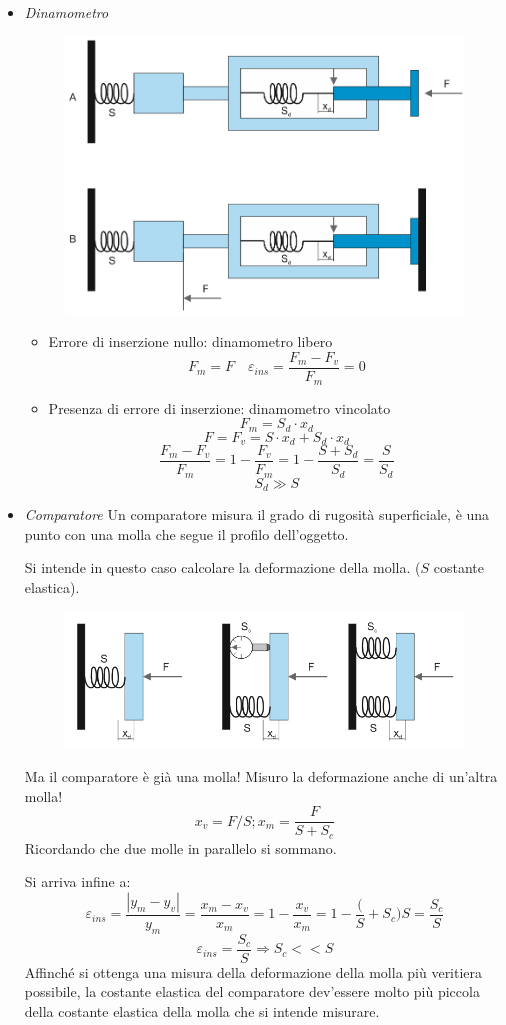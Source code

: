 \documentclass[a4paper, 15pt]{article}
\begin{document}
\begin{adjustwidth}{2in}{}
\begin{enumerate}
\begin{itemize}
	\item \textit{Dinamometro} 
	\begin{figure}[H]
		\centering
		\includegraphics[width=0.5\linewidth]{fig/screenshot019}
		\label{fig:screenshot019}
	\end{figure}
		\begin{itemize}
			\item Errore di inserzione nullo: dinamometro libero			
			\[F_m = F \quad \varepsilon_{ins} = \dfrac{F_m-F_v}{F_m} = 0\]
			\item Presenza di errore di inserzione: dinamometro vincolato
			\[F_m = S_d\cdot x_d\]
			\[F=F_v = S\cdot x_d + S_d\cdot x_d\]
			\[\dfrac{F_m-F_v}{F_m} = 1 - \dfrac{F_v}{F_m} = 1 - \dfrac{S+S_d}{S_d} = \dfrac{S}{S_d}\]
			\[S_d\gg S\]
		\end{itemize}
	\item \textit{Comparatore} 
	Un comparatore misura il grado di rugosità superficiale, è una punto con una molla che segue il profilo dell'oggetto. \newline
	
	Si intende in questo caso calcolare la deformazione della molla. ($S$ costante elastica).
	
\begin{figure}[H]
	\centering
	\includegraphics[width=0.5\linewidth]{fig/screenshot020}
	\label{fig:screenshot020}
\end{figure}

	Ma il comparatore è già una molla! Misuro la deformazione anche di un'altra molla!
	\[ x_v = F/S; x_m = \dfrac{F}{S + S_c}\]
	Ricordando che due molle in parallelo si sommano. 
	
	Si arriva infine a:
	\[\varepsilon_{ins} = \dfrac{|y_m - y_v|}{y_m} = \dfrac{x_m - x_v}{x_m} = 1- \dfrac{x_v}{x_m} = 1- \dfrac(S + S_c){S}  = \dfrac{S_c}{S} \] 
	\[\varepsilon_{ins} =  \dfrac{S_c}{S} \Rightarrow S_c << S \]
	Affinché si ottenga una misura della deformazione della molla più veritiera possibile, la costante elastica del comparatore dev'essere molto più piccola della costante elastica della molla che si intende misurare.	
	\end{itemize}


\end{enumerate}
\end{adjustwidth}
\end{document}
